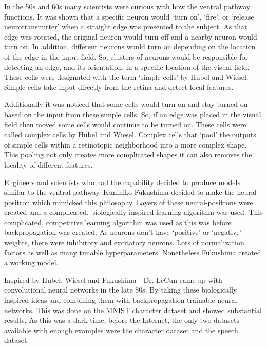 In the 50s and 60s many scientists were curious with how the ventral pathway functions. 
It was shown that a specific neuron would `turn on', `fire', or `release neurotransmitter' when a straight edge was 
presented to the subject.
As that edge was rotated, the original neuron would turn off and a nearby neuron would turn on.
In addition, different neurons would turn on depending on the location of the edge in the input field.
So, clusters of neurons would be responsible for detecting an edge, and its orientation, in a specific location of the visual field.
These cells were designated with the term `simple cells' by Hubel and Wiesel.
Simple cells take input directly from the retina and detect local features.

Additionally it was noticed that some cells would turn on and stay turned on based on the input from these simple cells.
So, if an edge was placed in the visual field then moved some cells would continue to be turned on.
These cells were called complex cells by Hubel and Wiesel.
Complex cells that `pool' the outputs of simple cells within a retinotopic neighborhood into a more complex shape.
This pooling not only creates more complicated shapes it can also removes the locality of different features.

Engineers and scientists who had the capability decided to produce models similar to the ventral pathway.
Kunihiko Fukushima decided to make the neural-positron which mimicked this philosophy.
Layers of these neural-positrons were created and a complicated, biologically inspired learning algorithm was used.
This complicated, competitive learning algorithm was used as this was before backpropagation was created.
As neurons don't have `positive' or `negative' weights, there were inhibitory and excitatory neurons.
Lots of normalization factors as well as many tunable hyperparameters.
Nonetheless Fukushima created a working model.

Inspired by Hubel, Wiesel and Fukushima - Dr. LeCun came up with convolutional neural networks in the late 80s.
By taking these biologically inspired ideas and combining them with backpropagation trainable neural networks.
This was done on the MNIST character dataset and showed substantial results.
As this was a dark time, before the Internet, the only two datasets available with enough examples were the character dataset and 
the speech dataset.

